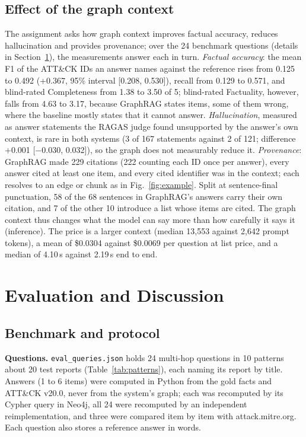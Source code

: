 \documentclass[conference,letterpaper]{IEEEtran}
\newcommand{\code}[1]{\texttt{#1}}
\begin{document}
\subsection{Effect of the graph context}
The assignment asks how graph context improves factual accuracy, reduces hallucination and provides provenance; over the 24 benchmark questions (details in Section~\ref{sec:eval}), the measurements answer each in turn. \emph{Factual accuracy}: the mean F1 of the ATT\&CK IDs an answer names against the reference rises from 0.125 to 0.492 (+0.367, 95\% interval [0.208, 0.530]), recall from 0.129 to 0.571, and blind-rated Completeness from 1.38 to 3.50 of 5; blind-rated Factuality, however, falls from 4.63 to 3.17, because GraphRAG states items, some of them wrong, where the baseline mostly states that it cannot answer. \emph{Hallucination}, measured as answer statements the RAGAS judge found unsupported by the answer's own context, is rare in both systems (3 of 167 statements against 2 of 121; difference +0.001 [$-0.030$, 0.032]), so the graph does not measurably reduce it. \emph{Provenance}: GraphRAG made 229 citations (222 counting each ID once per answer), every answer cited at least one item, and every cited identifier was in the context; each resolves to an edge or chunk as in Fig.~\ref{fig:example}. Split at sentence-final punctuation, 58 of the 68 sentences in GraphRAG's answers carry their own citation, and 7 of the other 10 introduce a list whose items are cited. The graph context thus changes what the model can say more than how carefully it says it (inference). The price is a larger context (median 13,553 against 2,642 prompt tokens), a mean of \$0.0304 against \$0.0069 per question at list price, and a median of 4.10\,s against 2.19\,s end to end.

\section{Evaluation and Discussion}\label{sec:eval}
\subsection{Benchmark and protocol}
\textbf{Questions.} \code{eval\_queries.json} holds 24 multi-hop questions in 10 patterns about 20 test reports (Table~\ref{tab:patterns}), each naming its report by title. Answers (1 to 6 items) were computed in Python from the gold facts and ATT\&CK v20.0, never from the system's graph; each was recomputed by its Cypher query in Neo4j, all 24 were recomputed by an independent reimplementation, and three were compared item by item with attack.mitre.org. Each question also stores a reference answer in words.
\end{document}
